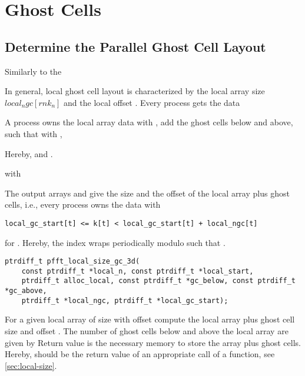 \section{Ghost Cells}

\subsection{Determine the Parallel Ghost Cell Layout}

Similarly to the

In general, local ghost cell layout is characterized by the local array size $local_ngc[rnk_n]$ and
the local offset . Every process gets the data

A process owns the local array data
 with ,
add the ghost cells below and above, such that
 with ,

Hereby,  and .

 with 

The output arrays  and  give the size and the offset of the local array plus ghost cells, i.e.,
every process owns the data  with
\begin{lstlisting}
local_gc_start[t] <= k[t] < local_gc_start[t] + local_ngc[t]
\end{lstlisting}
for .
Hereby, the index  wraps periodically modulo  such that .

\begin{lstlisting}
ptrdiff_t pfft_local_size_gc_3d(
    const ptrdiff_t *local_n, const ptrdiff_t *local_start,
    ptrdiff_t alloc_local, const ptrdiff_t *gc_below, const ptrdiff_t *gc_above,
    ptrdiff_t *local_ngc, ptrdiff_t *local_gc_start);
\end{lstlisting}
For a given local array of size  with offset  compute the
local array plus ghost cell size  and offset .
The number of ghost cells below and above the local array are given by
Return value is the necessary memory to store the array plus ghost cells.
Hereby,  should be the return value of an appropriate
call of a  function, see \ref{sec:local-size}.

